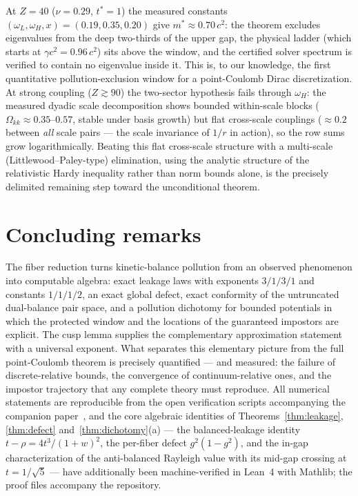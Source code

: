 \documentclass[11pt,reqno]{amsart}
\theoremstyle{definition}
\theoremstyle{remark}
\begin{document}
At $Z=40$ ($\nu=0.29$, $t^{*}=1$) the measured constants
$(\omega_{L},\omega_{H},x)=(0.19,0.35,0.20)$ give
$m^{*}\approx0.70\,c^{2}$: the theorem excludes eigenvalues from the
deep two-thirds of the upper gap, the physical ladder (which starts at
$\gamma c^{2}=0.96\,c^{2}$) sits above the window, and the certified
solver spectrum is verified to contain no eigenvalue inside it. This
is, to our knowledge, the first quantitative pollution-exclusion window
for a point-Coulomb Dirac discretization. At strong coupling
($Z\gtrsim90$) the two-sector hypothesis fails through $\omega_{H}$:
the measured dyadic scale decomposition shows bounded within-scale
blocks ($\Omega_{kk}\approx0.35$--$0.57$, stable under basis growth)
but flat cross-scale couplings ($\approx0.2$ between \emph{all} scale
pairs --- the scale invariance of $1/r$ in action), so the row sums
grow logarithmically. Beating this flat cross-scale structure with a
multi-scale (Littlewood--Paley-type) elimination, using the analytic
structure of the relativistic Hardy inequality rather than norm bounds
alone, is the precisely delimited remaining step toward the
unconditional theorem.

\section{Concluding remarks}

The fiber reduction turns kinetic-balance pollution from an observed
phenomenon into computable algebra: exact leakage laws with exponents
$3/1/3/1$ and constants $1/1/1/2$, an exact global defect, exact
conformity of the untruncated dual-balance pair space, and a pollution
dichotomy for bounded potentials in which the protected window and the
locations of the guaranteed impostors are explicit. The cusp lemma
supplies the complementary approximation statement with a universal
exponent. What separates this elementary picture from the full
point-Coulomb theorem is precisely quantified --- and measured: the
failure of discrete-relative bounds, the convergence of
continuum-relative ones, and the impostor trajectory that any complete
theory must reproduce. All numerical statements are reproducible from
the open verification scripts accompanying the companion
paper~\cite{companion}, and the core algebraic identities of
Theorems~\ref{thm:leakage}, \ref{thm:defect} and~\ref{thm:dichotomy}(a)
--- the balanced-leakage identity $t-\rho=4t^{3}/(1+w)^{2}$, the
per-fiber defect $g^{2}(1-g^{2})$, and the in-gap characterization of
the anti-balanced Rayleigh value with its mid-gap crossing at
$t=1/\sqrt{5}$ --- have additionally been machine-verified in Lean~4
with Mathlib; the proof files accompany the repository.
\end{document}
